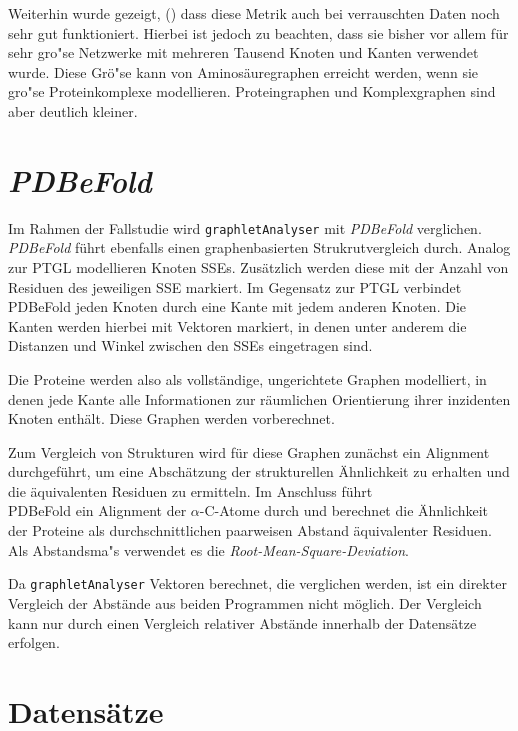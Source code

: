 \documentclass{report}
\begin{document}
Weiterhin wurde gezeigt, (\cite{frqdistribution}) dass diese Metrik auch bei verrauschten Daten noch sehr gut funktioniert. Hierbei ist jedoch zu beachten, dass sie bisher vor allem f\"ur sehr gro"se Netzwerke mit mehreren Tausend Knoten und Kanten verwendet wurde. Diese Gr\"o"se kann von Aminos\"auregraphen erreicht werden, wenn sie gro"se Proteinkomplexe modellieren. Proteingraphen und Komplexgraphen sind aber deutlich kleiner.

\section{\textit{PDBeFold}}

Im Rahmen der Fallstudie wird \texttt{graphletAnalyser} mit \textit{PDBeFold} \cite{pdbefold} verglichen. \textit{PDBeFold} f\"uhrt ebenfalls einen graphenbasierten Strukrutvergleich durch. Analog zur PTGL modellieren Knoten SSEs. Zus\"atzlich werden diese mit der Anzahl von Residuen des jeweiligen SSE markiert. Im Gegensatz zur PTGL verbindet PDBeFold jeden Knoten durch eine Kante mit jedem anderen Knoten. Die Kanten werden hierbei mit Vektoren markiert, in denen unter anderem die Distanzen und Winkel zwischen den SSEs eingetragen sind.

Die Proteine werden also als vollst\"andige, ungerichtete Graphen modelliert, in denen jede Kante alle Informationen zur r\"aumlichen Orientierung ihrer inzidenten Knoten enth\"alt. Diese Graphen werden vorberechnet.

Zum Vergleich von Strukturen wird f\"ur diese Graphen zun\"achst ein Alignment durchgef\"uhrt, um eine Absch\"atzung der strukturellen \"Ahnlichkeit zu erhalten und die \"aquivalenten Residuen zu ermitteln. Im Anschluss f\"uhrt \\ PDBeFold ein Alignment der $\alpha$-C-Atome durch und berechnet die \"Ahnlichkeit der Proteine als durchschnittlichen paarweisen Abstand \"aquivalenter Residuen. Als Abstandsma"s verwendet es die \textit{Root-Mean-Square-Deviation}.

Da \texttt{graphletAnalyser} Vektoren berechnet, die verglichen werden, ist ein direkter Vergleich der Abst\"ande aus beiden Programmen nicht m\"oglich. Der Vergleich kann nur durch einen Vergleich relativer Abst\"ande innerhalb der Datens\"atze erfolgen.


\section{Datens\"atze}
\end{document}
